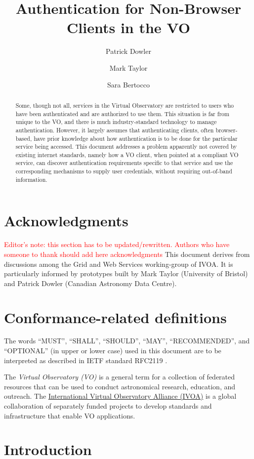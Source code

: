 \documentclass[11pt,a4paper]{ivoa}
\title{Authentication for Non-Browser Clients in the VO}
\author{Patrick Dowler}
\author{Mark Taylor}
\author{Sara Bertocco}
\begin{document}
\begin{abstract}
Some, though not all, services in the Virtual Observatory are
restricted to users who have been authenticated and are authorized to use them.
This situation is far from unique to the VO,
and there is much industry-standard technology to manage authentication.
However, it largely assumes that authenticating clients,
often browser-based, have prior knowledge about
how authentication is to be done
for the particular service being accessed.
This document addresses a problem apparently not covered
by existing internet standards, namely how a VO client,
when pointed at a compliant VO service,
can discover authentication requirements specific to that service
and use the corresponding mechanisms to supply user credentials,
without requiring out-of-band information.
\end{abstract}


\section*{Acknowledgments}

\textcolor{red}{Editor's note: this section has to be
updated/rewritten. Authors who have someone to thank should
add here acknowledgments}
This document derives from discussions among the Grid and Web Services
working-group of IVOA. It is particularly informed by prototypes built
by Mark Taylor (University of Bristol) and Patrick Dowler
(Canadian Astronomy Data Centre).


\section*{Conformance-related definitions}

The words ``MUST'', ``SHALL'', ``SHOULD'', ``MAY'', ``RECOMMENDED'', and
``OPTIONAL'' (in upper or lower case) used in this document are to be
interpreted as described in IETF standard RFC2119 \citep{std:RFC2119}.

The \emph{Virtual Observatory (VO)} is a
general term for a collection of federated resources that can be used
to conduct astronomical research, education, and outreach.
The \href{https://www.ivoa.net}{International
Virtual Observatory Alliance (IVOA)} is a global
collaboration of separately funded projects to develop standards and
infrastructure that enable VO applications.


\section{Introduction}\label{sec:intro}
\end{document}
